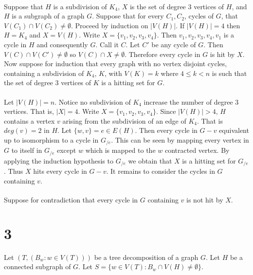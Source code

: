\documentclass[letterpaper,12pt,oneside,onecolumn]{report}
\begin{document}
\paragraph{}
Suppose that $H$ is a subdivision of $K_4$, $X$ is the set of degree $3$ vertices of $H$, and $H$ is a subgraph of a graph $G$. Suppose that for every $C_1, C_2$, cycles of $G$, that $V(C_1) \cap V(C_2) \neq \emptyset$. Proceed by induction on $|V(H)|$. If $|V(H)|=4$ then $H = K_4$ and $X = V(H)$. Write $X = \{v_1,v_2,v_3,v_4\}$. Then $v_1,v_2,v_3,v_4,v_1$ is a cycle in $H$ and consequently $G$. Call it $C$. Let $C'$ be any cycle of $G$. Then $V(C) \cap V(C') \neq \emptyset$ so $V(C) \cap X \neq \emptyset$. Therefore every cycle in $G$ is hit by $X$. Now suppose for induction that every graph with no vertex disjoint cycles, containing a subdivision of $K_4$, $K$, with $V(K) = k$ where $4 \leq k < n$ is such that the set of degree $3$ vertices of $K$ is a hitting set for $G$.
\paragraph{}
Let $|V(H)| = n$. Notice no subdivision of $K_4$ increase the number of degree $3$ vertices. That is, $|X| = 4$. Write $X = \{v_1, v_2, v_3, v_4\}$. Since $|V(H)| > 4$, $H$ contains a vertex $v$ arising from the subdivision of an edge of $K_4$. That is $deg(v) = 2$ in $H$. Let $\{w,v\} = e \in E(H)$. Then every cycle in $G-v$ equivalent up to isomorphism to a cycle in $G_{/e}$. This can be seen by mapping every vertex in $G$ to itself in $G_{/e}$ except $w$ which is mapped to the $w$ contracted vertex. By applying the induction hypothesis to $G_{/e}$ we obtain that $X$ is a hitting set for $G_{/e}$. Thus $X$ hits every cycle in $G-v$. It remains to consider the cycles in $G$ containing $v$.
\paragraph{}
Suppose for contradiction that every cycle in $G$ containing $v$ is not hit by $X$.
\section*{3}
\paragraph{}
Let $(T,(B_w : w\in V(T)))$ be a tree decomposition of a graph $G$. Let $H$ be a connected subgraph of $G$. Let $S = \{w \in V(T) : B_w \cap V(H) \neq \emptyset \}$.
\end{document}
